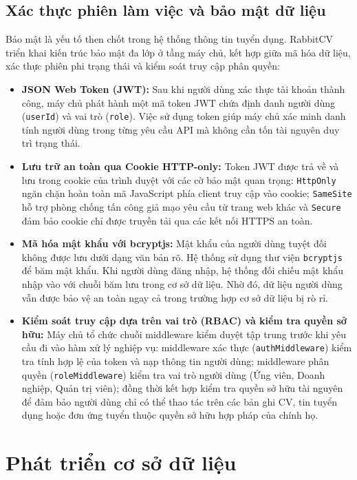 \subsection{Xác thực phiên làm việc và bảo mật dữ liệu}

Bảo mật là yếu tố then chốt trong hệ thống thông tin tuyển dụng. RabbitCV triển khai kiến trúc bảo mật đa lớp ở tầng máy chủ, kết hợp giữa mã hóa dữ liệu, xác thực phiên phi trạng thái và kiểm soát truy cập phân quyền:

\begin{itemize}
    \item \textbf{JSON Web Token (JWT):} Sau khi người dùng xác thực tài khoản thành công, máy chủ phát hành một mã token JWT chứa định danh người dùng (\texttt{userId}) và vai trò (\texttt{role}). Việc sử dụng token giúp máy chủ xác minh danh tính người dùng trong từng yêu cầu API mà không cần tốn tài nguyên duy trì trạng thái.
    \item \textbf{Lưu trữ an toàn qua Cookie HTTP-only:} Token JWT được trả về và lưu trong cookie của trình duyệt với các cờ bảo mật quan trọng: \texttt{HttpOnly} ngăn chặn hoàn toàn mã JavaScript phía client truy cập vào cookie; \texttt{SameSite} hỗ trợ phòng chống tấn công giả mạo yêu cầu từ trang web khác và \texttt{Secure} đảm bảo cookie chỉ được truyền tải qua các kết nối HTTPS an toàn.
    \item \textbf{Mã hóa mật khẩu với bcryptjs:} Mật khẩu của người dùng tuyệt đối không được lưu dưới dạng văn bản rõ. Hệ thống sử dụng thư viện \texttt{bcryptjs} để băm mật khẩu. Khi người dùng đăng nhập, hệ thống đối chiếu mật khẩu nhập vào với chuỗi băm lưu trong cơ sở dữ liệu. Nhờ đó, dữ liệu người dùng vẫn được bảo vệ an toàn ngay cả trong trường hợp cơ sở dữ liệu bị rò rỉ.
    \item \textbf{Kiểm soát truy cập dựa trên vai trò (RBAC) và kiểm tra quyền sở hữu:} Máy chủ tổ chức chuỗi middleware kiểm duyệt tập trung trước khi yêu cầu đi vào hàm xử lý nghiệp vụ: middleware xác thực (\texttt{authMiddleware}) kiểm tra tính hợp lệ của token và nạp thông tin người dùng; middleware phân quyền (\texttt{roleMiddleware}) kiểm tra vai trò người dùng (Ứng viên, Doanh nghiệp, Quản trị viên); đồng thời kết hợp kiểm tra quyền sở hữu tài nguyên để đảm bảo người dùng chỉ có thể thao tác trên các bản ghi CV, tin tuyển dụng hoặc đơn ứng tuyển thuộc quyền sở hữu hợp pháp của chính họ.
\end{itemize}

\section{Phát triển cơ sở dữ liệu}

